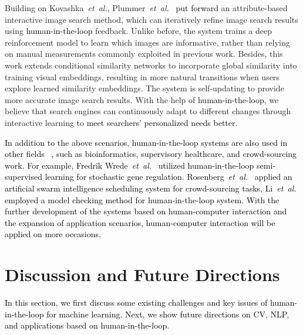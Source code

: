 \documentclass{article}
\newcommand\etal{\emph{et~al.}}
\newcommand{\p}[1]{\textcolor{black}{#1}}
\newcommand{\REO}[1]{\textcolor{black}{#1}}
\newcommand{\ZJH}[1]{\textcolor{black}{#1}}
\begin{document}
{Building on Kovashka~\etal, Plummer~\etal~\cite{plummer2019give} \p{put forward} an attribute-based interactive image search method, which can iteratively refine image search results using \REO{human-in-the-loop} feedback. Unlike before, the system trains a deep reinforcement model to learn which images are informative, rather than relying on manual measurements commonly exploited in previous work. Besides, this work extends conditional similarity networks to incorporate global similarity into training visual embeddings, resulting in more natural transitions when users explore learned similarity embeddings.
The system is self-updating to provide more accurate image search results.
With the help of \REO{human-in-the-loop}, we believe that search engines can continuously adapt to different changes through interactive learning to \p{meet searchers' personalized needs better.}}


\REO{
In addition to the above scenarios, \REO{human-in-the-loop} systems are also used in other fields ~\cite{wrede2019smart, zhu2020easierpath}, such as bioinformatics, supervisory healthcare, and crowd-sourcing work. For example, Fredrik Wrede~\etal~\cite{wrede2019smart} \p{utilized} \REO{human-in-the-loop} semi-supervised learning for stochastic gene regulation.
Rosenberg~\etal~\cite{rosenberg2016artificial} \p{applied} an artificial swarm intelligence scheduling system for crowd-sourcing tasks,
Li~\etal ~\cite{li2020explanations} \p{employed} a model checking method for \REO{human-in-the-loop} system.
With the further development of the systems based on human-computer interaction and the expansion of application scenarios, human-computer interaction will be applied on more occasions.}



\section{Discussion and Future Directions}
\label{sec:DF}

\REO{In this section, we first discuss some existing challenges and key issues of \ZJH{human-in-the-loop} for machine learning.
Next, we show future directions on CV, NLP, and applications based on \ZJH{human-in-the-loop.}}
\end{document}
